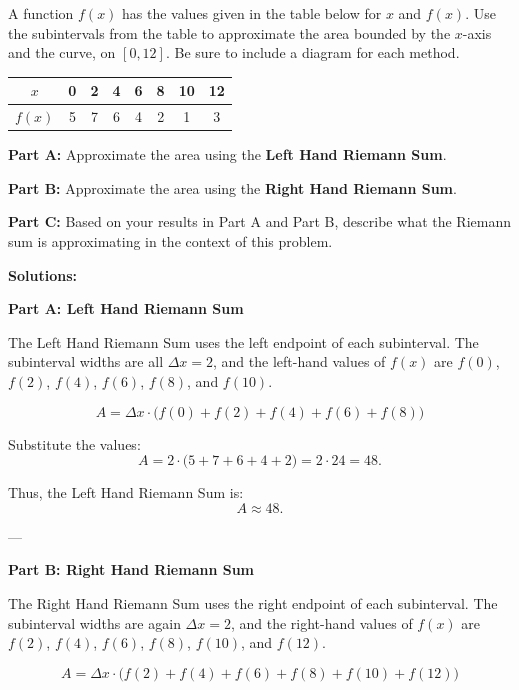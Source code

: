 \documentclass{article}
\begin{document}
\begin{tcolorbox}[colback=blue!10, colframe=blue!50!black, title=Riemann Sum Problem]
A function \(f(x)\) has the values given in the table below for \(x\) and \(f(x)\). Use the subintervals from the table to approximate the area bounded by the \(x\)-axis and the curve, on \([0, 12]\). Be sure to include a diagram for each method.

\begin{center}
\begin{tabular}{|c|c|c|c|c|c|c|c|}
\hline
\(x\) & 0 & 2 & 4 & 6 & 8 & 10 & 12 \\
\hline
\(f(x)\) & 5 & 7 & 6 & 4 & 2 & 1 & 3 \\
\hline
\end{tabular}
\end{center}

\textbf{Part A:} Approximate the area using the \textbf{Left Hand Riemann Sum}. 

\textbf{Part B:} Approximate the area using the \textbf{Right Hand Riemann Sum}.

\textbf{Part C:} Based on your results in Part A and Part B, describe what the Riemann sum is approximating in the context of this problem.
\end{tcolorbox}

\textbf{Solutions:}

\textbf{Part A: Left Hand Riemann Sum}

The Left Hand Riemann Sum uses the left endpoint of each subinterval. The subinterval widths are all \(\Delta x = 2\), and the left-hand values of \(f(x)\) are \(f(0)\), \(f(2)\), \(f(4)\), \(f(6)\), \(f(8)\), and \(f(10)\).

\[
A = \Delta x \cdot \big(f(0) + f(2) + f(4) + f(6) + f(8)\big)
\]

Substitute the values:
\[
A = 2 \cdot \big(5 + 7 + 6 + 4 + 2\big) = 2 \cdot 24 = 48.
\]

Thus, the Left Hand Riemann Sum is:
\[
A \approx 48.
\]

---

\textbf{Part B: Right Hand Riemann Sum}

The Right Hand Riemann Sum uses the right endpoint of each subinterval. The subinterval widths are again \(\Delta x = 2\), and the right-hand values of \(f(x)\) are \(f(2)\), \(f(4)\), \(f(6)\), \(f(8)\), \(f(10)\), and \(f(12)\).

\[
A = \Delta x \cdot \big(f(2) + f(4) + f(6) + f(8) + f(10) + f(12)\big)
\]
\end{document}
